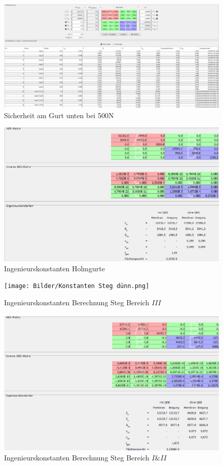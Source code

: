 \begin{figure}[h]
	\centering
	\includegraphics[width=1\textwidth]{Bilder/sicher4}
	\caption{Sicherheit am Gurt unten bei 500N}
	\label{sicher-gurt}
\end{figure}
\begin{figure}[h]
	\includegraphics[width=1.0\textwidth]{Bilder/Konstanten Holmgurte.png}
	\caption{Ingenieurskonstanten Holmgurte}
	\label{fig:Ingenieurskonstanten Holmgurte}
\end{figure}
\begin{figure}[h]
	\texttt{[image: Bilder/Konstanten Steg dünn.png]}
	\caption{Ingenieurskonstanten Berechnung Steg Bereich $III$}
	\label{fig:Ingenieurskonstanten Steg dünn}
\end{figure}
\begin{figure}[h]
	\includegraphics[width=1.0\textwidth]{Bilder/Konstanten Steg dick.png}
	\caption{Ingenieurskonstanten Berechnung Steg Bereich $I\&II$}
	\label{fig:Ingenieurskonstanten Steg dick}
\end{figure}
